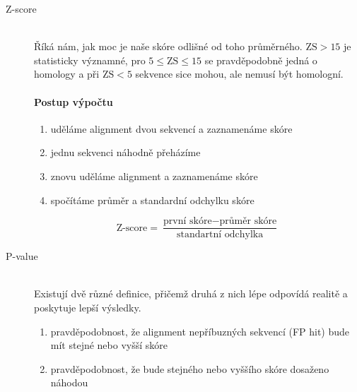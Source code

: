 \documentclass[DIV=8]{scrreprt}
\begin{document}
\begin{description}
\item[Z-score]\hfill \\
Říká nám, jak moc je naše skóre odlišné od toho průměrného. \(\text{ZS} > 15\) je statisticky významné, pro \(5 \leq \text{ZS} \leq 15\) se pravděpodobně jedná o homology a při \(\text{ZS} < 5\) sekvence sice mohou, ale nemusí být homologní.

\paragraph{Postup výpočtu}
\begin{enumerate}[nosep]
    \item uděláme alignment dvou sekvencí a zaznamenáme skóre
    \item jednu sekvenci náhodně přeházíme
    \item znovu uděláme alignment a zaznamenáme skóre
    \item spočítáme průměr a standardní odchylku skóre
\end{enumerate}



\[\text{Z-score} = \frac{\text{první skóre} - \text{průměr skóre}}{\text{standartní odchylka}}\]


\item[P-value]\hfill \\
Existují dvě různé definice, přičemž druhá z nich lépe odpovídá realitě a poskytuje lepší výsledky.
\begin{enumerate}[nosep]
    \item pravděpodobnost, že alignment nepříbuzných sekvencí (FP hit) bude mít stejné nebo vyšší skóre
    \item pravděpodobnost, že bude stejného nebo vyššího skóre dosaženo náhodou
\end{enumerate}




\end{description}
\end{document}
